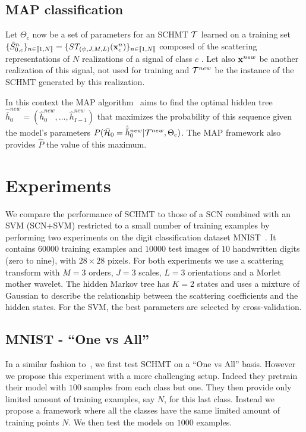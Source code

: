 \documentclass{article}
\begin{document}
  \vspace{-5pt}
	\subsection{MAP classification}
    \label{subsec:SCN/MAP}
    \vspace{-5pt}
    Let $\Theta_{c}$ now be a set of parameters for an SCHMT $\mathcal{T}$ learned on a training set $\{\bar{S}_{0,c}^n\}_{n \in \llbracket1, N \rrbracket} = \{ST_{(\psi, J, M, L)}({\bf x}_{c}^{n})\}_{n \in \llbracket1, N \rrbracket}$ composed of the scattering representations of $N$ realizations of a signal of class $c$ . Let also ${\bf x}^{new}$ be another realization of this signal, not used for training and $\mathcal{T}^{new}$ be the instance of the SCHMT generated by this realization.

    In this context the MAP algorithm~\cite{durand2001statistical} aims to find the optimal hidden tree $\hat{\bar{h}}_{0}^{new}=(\hat{h}_{0}^{new}, \ldots , \hat{h}_{I-1}^{new})$ that maximizes the probability of this sequence given the model's parameters $P(\bar{\mathcal{H}}_{0}= \hat{\bar{h}}_{0}^{new}|\mathcal{T}^{new},\Theta_{c})$. The MAP framework also provides $\hat{P}$ the value of this maximum.
    
\section{Experiments}
  \label{sec:Exps}
  \vspace{-5pt}
  We compare the performance of SCHMT to those of a SCN combined with an SVM (SCN+SVM) restricted to a small number of training examples by performing two experiments on the digit classification dataset MNIST~\cite{lecun2016web}. It contains $60000$ training examples and $10000$ test images of $10$ handwritten digits (zero to nine), with $28\times28$ pixels.
  For both experiments we use a scattering transform with $M=3$ orders, $J=3$ scales, $L=3$ orientations and a Morlet mother wavelet. The hidden Markov tree has $K=2$ states and uses a mixture of Gaussian to describe the relationship between the scattering coefficients and the hidden states. For the SVM, the best parameters are selected by cross-validation.
  
  \vspace{-5pt}
  \subsection{MNIST - ``One vs All''}
		\label{subsec:Exps/MNIST - 1vsAll}
		\vspace{-5pt}
		In a similar fashion to~\cite{salakhutdinov2010one}, we first test SCHMT on a ``One vs All'' basis. However we propose this experiment with a more challenging setup. Indeed they pretrain their model with $100$ samples from each class but one. They then provide only limited amount of training examples, say $N$, for this last class. Instead we propose a framework where all the classes have the same limited amount of training points $N$. We then test the models on $1000$ examples.
		
\end{document}

